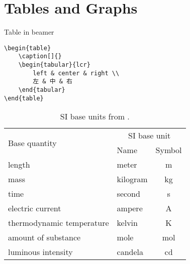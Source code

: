 \documentclass[x11names,aspectratio=32]{beamer}
\begin{document}
\section{Tables and Graphs}
\begin{frame}{Table in beamer}
    \begin{verbatim}
\begin{table}
    \caption[]{}
    \begin{tabular}{lcr}
        left & center & right \\
        左 & 中 & 右
    \end{tabular}
\end{table}    
    \end{verbatim}

    \vfill{}

    \begin{table}
        \caption{SI base units from \smartcite{NIST-units}. \hyperlink{hyperlink}{}}
        \label{tb:si-units}
        \begin{tabular}{*{2}{l}c}
            \toprule
            \multirow{2}{*}{Base quantity} & \multicolumn{2}{c}{SI base unit}              \\ \cline{2-3}
                                            & Name                             & Symbol     \\
            \midrule
            length                         & meter                            & \unit{m}   \\
            mass                           & kilogram                         & \unit{kg}  \\
            time                           & second                           & \unit{s}   \\
            electric current               & ampere                           & \unit{A}   \\
            thermodynamic temperature      & kelvin                           & \unit{K}   \\
            amount of substance            & mole                             & \unit{mol} \\
            luminous intensity             & candela                          & \unit{cd}  \\
            \bottomrule
        \end{tabular}
    \end{table}
\end{frame}
\end{document}
